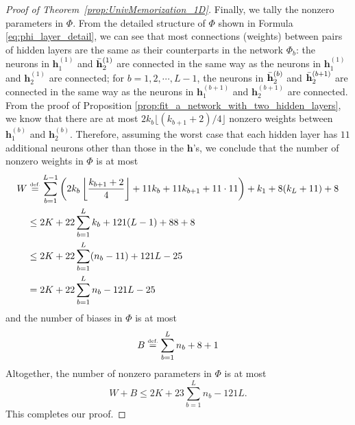 \documentclass{article}
\numberwithin{equation}{section}
\theoremstyle{definition}
\newcommand{\eqdef}{\ensuremath{\stackrel{\mbox{\upshape\tiny def.}}{=}}}
\begin{document}
\begin{proof}[{Proof of Theorem~\ref{prop:UnivMemorization_1D}}]
Finally, we tally the nonzero parameters in $\Phi$. From the detailed structure of $\Phi$ shown in Formula \ref{eq:phi_layer_detail}, we can see that most connections (weights) between pairs of hidden layers are the same as their counterparts in the network $\Phi_b$: the neurons in $\mathbf{h}_1^{(1)}$ and $\Bar{\mathbf{h}}_2^{(1)}$ are connected in the same way as the neurons in $\mathbf{h}_1^{(1)}$ and $\mathbf{h}_2^{(1)}$ are connected; for $b=1,2,\cdots,L-1$, the neurons in $\Bar{\mathbf{h}}_2^{(b)}$ and $\Bar{\mathbf{h}}_2^{(b+1)}$ are connected in the same way as the neurons in $\mathbf{h}_1^{(b+1)}$ and $\mathbf{h}_2^{(b+1)}$ are connected. From the proof of Proposition \ref{prop:fit_a_network_with_two_hidden_layers}, we know that there are at most $2 k_b \lfloor (k_{b+1}+2)/4 \rfloor$ nonzero weights between $\mathbf{h}_1^{(b)}$ and $\mathbf{h}_2^{(b)}$. Therefore, assuming the worst case that each hidden layer has $11$ additional neurons other than those in the $\mathbf{h}$'s, we conclude that the number of nonzero weights in $\Phi$ is at most 
\begin{align*}
    W
    &\eqdef
    \sum_{b=1}^{L-1}
    \left(
        2 k_b \left\lfloor \frac{k_{b+1}+2}{4} \right\rfloor
        +
        11 k_b
        +
        11 k_{b+1}
        +
        11 \cdot 11
    \right)
    +
    k_1
    +
    8(k_L+11)
    +
    8
    \\
    &\le
    2K
    +
    22 \sum_{b=1}^{L} k_b
    +
    121(L-1)
    +
    88+8
    \\
    &\le
    2K
    +
    22 \sum_{b=1}^{L} (n_b - 11)
    +
    121L
    -
    25
    \\
    &=
    2K
    +
    22 \sum_{b=1}^{L} n_b 
    -
    121L
    -
    25
\end{align*}
and the number of biases in $\Phi$ is at most 
\[
    B \eqdef 
    \sum_{b=1}^{L} n_b 
    + 8 + 1
\]
Altogether, the number of nonzero parameters in $\Phi$ is at most
\[
    W + B 
    \le 
    2K +  23 \sum_{b=1}^{L} n_b - 121L .
\]
This completes our proof.
\end{proof}
\end{document}
